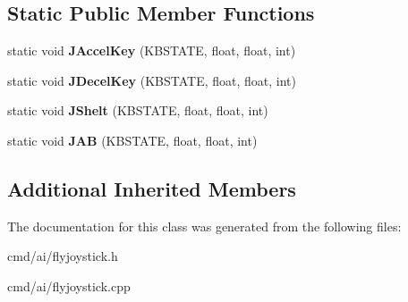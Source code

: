 \subsection*{Static Public Member Functions}
\begin{DoxyCompactItemize}
\item 
static void {\bfseries J\+Accel\+Key} (K\+B\+S\+T\+A\+TE, float, float, int)\hypertarget{classFlyByJoystick_abe60701deb1baec9860a8fab23451074}{}\label{classFlyByJoystick_abe60701deb1baec9860a8fab23451074}

\item 
static void {\bfseries J\+Decel\+Key} (K\+B\+S\+T\+A\+TE, float, float, int)\hypertarget{classFlyByJoystick_a06cacbd5625ebf87f3351355ad0d8d32}{}\label{classFlyByJoystick_a06cacbd5625ebf87f3351355ad0d8d32}

\item 
static void {\bfseries J\+Shelt} (K\+B\+S\+T\+A\+TE, float, float, int)\hypertarget{classFlyByJoystick_a80b3c3f414b7c3165f84a1b63467a058}{}\label{classFlyByJoystick_a80b3c3f414b7c3165f84a1b63467a058}

\item 
static void {\bfseries J\+AB} (K\+B\+S\+T\+A\+TE, float, float, int)\hypertarget{classFlyByJoystick_a449f1c8913567433d8b8d200373fe056}{}\label{classFlyByJoystick_a449f1c8913567433d8b8d200373fe056}

\end{DoxyCompactItemize}
\subsection*{Additional Inherited Members}


The documentation for this class was generated from the following files\+:\begin{DoxyCompactItemize}
\item 
cmd/ai/flyjoystick.\+h\item 
cmd/ai/flyjoystick.\+cpp\end{DoxyCompactItemize}
